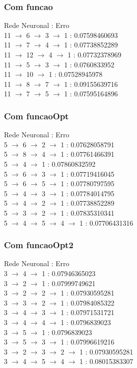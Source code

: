 \documentclass{article}
\begin{document}
\subsubsection{Com funcao}
Rede Neuronal : Erro\\
11 $\to$ 6 $\to$ 3 $\to$ 1 : 0.07598460693\\
11 $\to$ 7 $\to$ 4 $\to$ 1 : 0.07738852289\\
11 $\to$ 12 $\to$ 4 $\to$ 1 : 0.07732378969\\
11 $\to$ 5 $\to$ 3 $\to$ 1 : 0.0760833952\\
11 $\to$ 10 $\to$ 1 : 0.07528945978\\
11 $\to$ 8 $\to$ 7 $\to$ 1 : 0.09155639716\\
11 $\to$ 7 $\to$ 5 $\to$ 1 : 0.07595164896\\

\subsubsection{Com funcaoOpt}
Rede Neuronal : Erro\\
5 $\to$ 6 $\to$ 2 $\to$ 1 : 0.07628058791\\
5 $\to$ 8 $\to$ 4 $\to$ 1 : 0.07761466391\\
5 $\to$ 4 $\to$ 1 : 0.07860832592\\
5 $\to$ 6 $\to$ 3 $\to$ 1 : 0.07719416045\\
5 $\to$ 6 $\to$ 5 $\to$ 1 : 0.07780797595\\
5 $\to$ 4 $\to$ 3 $\to$ 1 : 0.07784014795\\
5 $\to$ 4 $\to$ 2 $\to$ 1 : 0.07738852289\\
5 $\to$ 3 $\to$ 2 $\to$ 1 : 0.07835310341\\
5 $\to$ 4 $\to$ 5 $\to$ 4 $\to$ 1 : 0.07706431316\\

\subsubsection{Com funcaoOpt2}
Rede Neuronal : Erro\\
3 $\to$ 4 $\to$ 1 : 0.07946365023\\
3 $\to$ 2 $\to$ 1 : 0.07999749621\\
3 $\to$ 2 $\to$ 2 $\to$ 1 : 0.07930595281\\
3 $\to$ 3 $\to$ 2 $\to$ 1 : 0.07984085322\\
3 $\to$ 4 $\to$ 3 $\to$ 1 : 0.07971531721\\
3 $\to$ 4 $\to$ 4 $\to$ 1 : 0.0796839023\\
3 $\to$ 5 $\to$ 1 : 0.0796839023\\
3 $\to$ 5 $\to$ 3 $\to$ 1 : 0.07996619216\\
3 $\to$ 2 $\to$ 3 $\to$ 2 $\to$ 1 : 0.07930595281\\
3 $\to$ 4 $\to$ 5 $\to$ 4 $\to$ 1 : 0.08015383307\\
\end{document}

